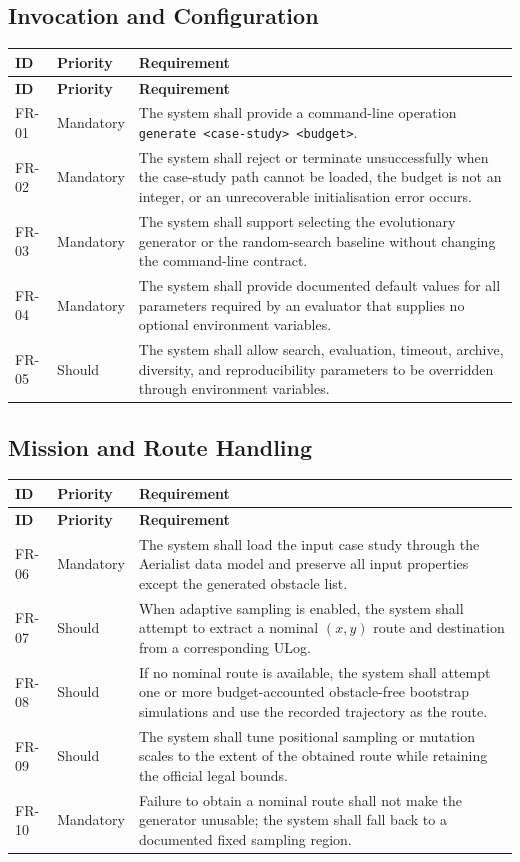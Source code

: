 \documentclass[11pt,a4paper]{report}
\begin{document}
\subsection{Invocation and Configuration}
\begin{longtable}{L{1.7cm} L{2.1cm} L{10.8cm}}
\toprule
\textbf{ID} & \textbf{Priority} & \textbf{Requirement}\\
\midrule
\endfirsthead
\toprule
\textbf{ID} & \textbf{Priority} & \textbf{Requirement}\\
\midrule
\endhead
FR-01 & Mandatory & The system shall provide a command-line operation \texttt{generate <case-study> <budget>}.\\
FR-02 & Mandatory & The system shall reject or terminate unsuccessfully when the case-study path cannot be loaded, the budget is not an integer, or an unrecoverable initialisation error occurs.\\
FR-03 & Mandatory & The system shall support selecting the evolutionary generator or the random-search baseline without changing the command-line contract.\\
FR-04 & Mandatory & The system shall provide documented default values for all parameters required by an evaluator that supplies no optional environment variables.\\
FR-05 & Should & The system shall allow search, evaluation, timeout, archive, diversity, and reproducibility parameters to be overridden through environment variables.\\
\bottomrule
\end{longtable}

\subsection{Mission and Route Handling}
\begin{longtable}{L{1.7cm} L{2.1cm} L{10.8cm}}
\toprule
\textbf{ID} & \textbf{Priority} & \textbf{Requirement}\\
\midrule
\endfirsthead
\toprule
\textbf{ID} & \textbf{Priority} & \textbf{Requirement}\\
\midrule
\endhead
FR-06 & Mandatory & The system shall load the input case study through the Aerialist data model and preserve all input properties except the generated obstacle list.\\
FR-07 & Should & When adaptive sampling is enabled, the system shall attempt to extract a nominal $(x,y)$ route and destination from a corresponding ULog.\\
FR-08 & Should & If no nominal route is available, the system shall attempt one or more budget-accounted obstacle-free bootstrap simulations and use the recorded trajectory as the route.\\
FR-09 & Should & The system shall tune positional sampling or mutation scales to the extent of the obtained route while retaining the official legal bounds.\\
FR-10 & Mandatory & Failure to obtain a nominal route shall not make the generator unusable; the system shall fall back to a documented fixed sampling region.\\
\bottomrule
\end{longtable}
\end{document}
